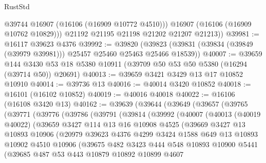 \begin{lexlean}{RustStd}
\begin{coremodule}
            @39744
            @16907
            (@16106 (@16909 @10772 @4510)))
          @16907
          (@16106 (@16909 @10762 @10829)))
        @21192
        @21195
        @21198
        @21202
        @21207
        @21213))
@39981 := @16117 @39623 @4376
@39992 := @39820
    (@39823 (@39831 (@39834 (@39849 (@39979 @39981))) @25457 @25460 @25463 @25466 @18539))
@40007 := @39659
    @144
    @3430
    @53
    @18
    @5380
    @10911
    (@39709 @50 @53 @50 @5380 (@16294 (@39714 @50)) @20691)
@40013 := @39659 @3421 @3429 @13 @17 @10852 @10910
@40014 := @39736 @13
@40016 := @40014 @3420 @10852
@40018 := @16101 (@16102 @10852)
@40019 := @40016 @40018
@40022 := @16106 (@16108 @3420 @13)
@40162 := @39639
    (@39644
      (@39649
        (@39657
          (@39765
            (@39771
              (@39776
                (@39786
                  (@39791
                    (@39814
                      (@39992
                        (@40007
                          (@40013
                            (@40019 @40022)
                            (@39659
                              @3427
                              @114
                              @13
                              @16
                              @10908
                              @4525
                              (@39669
                                @3427
                                @13
                                @10893
                                @10906
                                (@20979
                                  @39623
                                  @4376
                                  @4299
                                  @3424
                                  @1588
                                  @649
                                  @13
                                  @10893
                                  @10902
                                  @4510
                                  @10906
                                  (@39675
                                    @482
                                    @3423
                                    @444
                                    @548
                                    @10893
                                    @10900
                                    @5441
                                    (@39685
                                      @487
                                      @53
                                      @443
                                      @10879
                                      @10892
                                      @10899
                                      @4607

\end{coremodule}
\end{lexlean}
